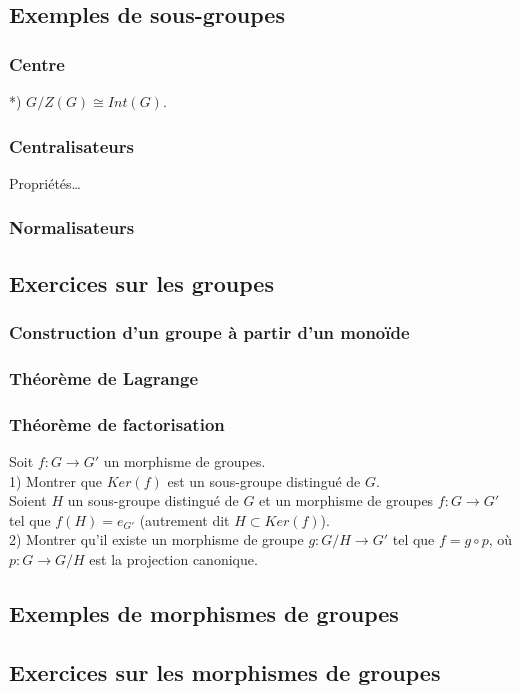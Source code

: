 \documentclass{article}
\begin{document}
\subsection{Exemples de sous-groupes}
\subsubsection{Centre}
*) $G/Z(G)\cong Int(G)$.
\subsubsection{Centralisateurs}
Propri\'et\'es\dots
\subsubsection{Normalisateurs\label{normalisateur}}

\subsection{Exercices sur les groupes}
\subsubsection{Construction d'un groupe \`a partir d'un mono\"ide}
\subsubsection{Th\'eor\`eme de Lagrange}
\subsubsection{Th\'eor\`eme de factorisation}
Soit $f:G\to G'$ un morphisme de groupes.\\
1) Montrer que $Ker(f)$ est un sous-groupe distingu\'e de $G$.\\
Soient $H$ un sous-groupe distingu\'e de $G$ et un morphisme de groupes $f:G\to G'$ tel que $f(H)=e_{G'}$ (autrement dit $H\subset Ker(f)$).\\
2) Montrer qu'il existe un morphisme de groupe $g:G/H\to G'$ tel que $f=g\circ p$, o\`u $p: G\to G/H$ est la projection canonique.

\subsection{Exemples de morphismes de groupes}

\subsection{Exercices sur les morphismes de groupes}
\end{document}
